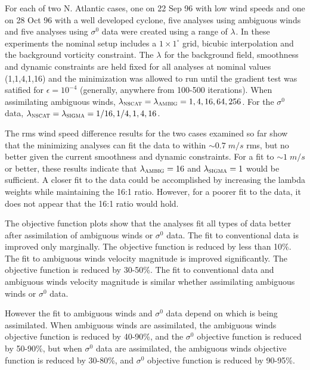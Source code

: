 \documentclass[11pt]{article}
\newcommand{\degrees}[1]{\mbox{$ {#1}^\circ $}}
\newcommand{\glm}[1]{\mbox{$ \lambda_{\mbox{\tiny #1}} $}}
\newcommand{\gl}[1]{\mbox{$ \lambda_{#1} $}}
\newcommand{\mks}[2]{\mbox{$ {#1} \; {#2} $}}
\newcommand{\s}[1]{\mbox{$ \sigma^{#1} $}}
\newcommand{\subsc}[2]{\mbox{$ #1_{\mbox{\sc \footnotesize #2}} $}}
\renewcommand{\glm}[1]{\subsc{\lambda}{{#1}}}
\begin{document}
For each of two N. Atlantic cases, one on 22 Sep 96 with low wind speeds
and one on 28 Oct 96 with a well developed cyclone, five analyses using
ambiguous winds and five analyses using \s0 data were created using a
range of \gl{}.  In these experiments the nominal setup includes a
\degrees{1 \times 1} grid, bicubic interpolation and the background
vorticity constraint.  The \gl{} for the background field, smoothness
and dynamic constraints are held fixed for all analyses at nominal
values (1,1,4,1,16) and the minimization was allowed to run until the
gradient test was satified for $ \epsilon = 10^{-4} $ (generally,
anywhere from 100-500 iterations).
When assimilating ambiguous winds, $ \glm{nscat} = \glm{ambig} = 1,
4, 16, 64, 256$.
For the \s0 data, $ \glm{nscat} = \glm{sigma} = 1/16,
1/4, 1, 4, 16$.

The rms wind speed difference results for the two cases examined so
far show that the minimizing analyses can fit the data to within
\mks{\sim 0.7}{m/s} rms, but no better given the current smoothness
and dynamic constraints.  For a fit to \mks{\sim 1}{m/s} or better,
these results indicate that $ \glm{ambig} = 16 $ and $ \glm{sigma} = 1
$ would be sufficient.  A closer fit to the data could be accomplished
by increasing the lambda weights while maintaining the 16:1 ratio.
However, for a poorer fit to the data, it does not appear that the
16:1 ratio would hold.

The objective function plots show that the analyses fit all types of
data better after assimilation of ambiguous winds or \s0 data.  The
fit to conventional data is improved only marginally.  The objective
function is reduced by less than 10\%.  The fit to ambiguous winds
velocity magnitude is improved significantly.  The objective function
is reduced by 30-50\%.  The fit to conventional data and ambiguous
winds velocity magnitude is similar whether assimilating ambiguous
winds or \s0 data.

However the fit to ambiguous winds and \s0 data depend on which is
being assimilated.  When ambiguous winds are assimilated, the
ambiguous winds objective function is reduced by 40-90\%, and the \s0
objective function is reduced by 50-90\%, but when \s0 data are
assimilated, the ambiguous winds objective function is reduced by
30-80\%, and \s0 objective function is reduced by 90-95\%.
\end{document}
